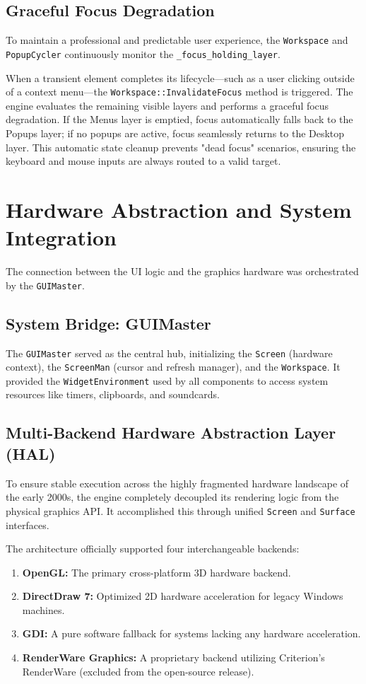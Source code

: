 \documentclass[11pt, a4paper]{article}
\begin{document}
\subsection{Graceful Focus Degradation}
To maintain a professional and predictable user experience, the \texttt{Workspace} and \texttt{PopupCycler} continuously monitor the \texttt{\_focus\_holding\_layer}. 

When a transient element completes its lifecycle---such as a user clicking outside of a context menu---the \texttt{Workspace::InvalidateFocus} method is triggered. The engine evaluates the remaining visible layers and performs a graceful focus degradation. If the Menus layer is emptied, focus automatically falls back to the Popups layer; if no popups are active, focus seamlessly returns to the Desktop layer. This automatic state cleanup prevents "dead focus" scenarios, ensuring the keyboard and mouse inputs are always routed to a valid target.

\section{Hardware Abstraction and System Integration}
The connection between the UI logic and the graphics hardware was orchestrated by the \texttt{GUIMaster}.

\subsection{System Bridge: GUIMaster}
The \texttt{GUIMaster} served as the central hub, initializing the \texttt{Screen} (hardware context), the \texttt{ScreenMan} (cursor and refresh manager), and the \texttt{Workspace}. It provided the \texttt{WidgetEnvironment} used by all components to access system resources like timers, clipboards, and soundcards.

\subsection{Multi-Backend Hardware Abstraction Layer (HAL)}
To ensure stable execution across the highly fragmented hardware landscape of the early 2000s, the engine completely decoupled its rendering logic from the physical graphics API. It accomplished this through unified \texttt{Screen} and \texttt{Surface} interfaces. 

The architecture officially supported four interchangeable backends:
\begin{enumerate}
    \item \textbf{OpenGL:} The primary cross-platform 3D hardware backend.
    \item \textbf{DirectDraw 7:} Optimized 2D hardware acceleration for legacy Windows machines.
    \item \textbf{GDI:} A pure software fallback for systems lacking any hardware acceleration.
    \item \textbf{RenderWare Graphics:} A proprietary backend utilizing Criterion's RenderWare (excluded from the open-source release).
\end{enumerate}
\end{document}
